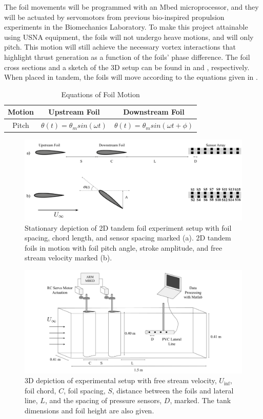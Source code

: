     The foil movements will be programmed with an Mbed microprocessor, and they will be actuated by servomotors from previous bio-inspired propulsion experiments in the Biomechanics Laboratory. To make this project attainable using USNA equipment, the foils will not undergo heave motions, and will only pitch. This motion will still achieve the necessary vortex interactions that highlight thrust generation as a function of the foils' phase difference. The foil cross sections and a sketch of the 3D setup can be found in  and , respectively. When placed in tandem, the foils will move according to the equations given in .
\begin{center}
\begin{table}
\caption{Equations of Foil Motion}
\label{tab:methods:EOM}
\begin{tabular}{ccc}
\toprule
Motion & Upstream Foil & Downstream Foil \\ 
\midrule
Pitch & \(\theta(t)=\theta _msin(\omega t)\) & \(\theta (t)=\theta _msin(\omega t+\phi)\) \\
\end{tabular}
\end{table}
\begin{figure}
\includegraphics[width=0.8\columnwidth]{figures/Experimental Setup.png}
\caption{Stationary depiction of 2D tandem foil experiment setup with foil spacing, chord length, and sensor spacing marked (a). 2D tandem foils in motion with foil pitch angle, stroke amplitude, and free stream velocity marked (b).}
\label{fig:methods:2D Setup}
\end{figure}
\begin{figure}
\includegraphics[width=0.95\columnwidth]{figures/3D Tank Setup.png}
\caption{3D depiction of experimental setup with free stream velocity, \(U_\inf\), foil chord, $C$, foil spacing, $S$, distance between the foils and lateral line, $L$, and the spacing of pressure sensors, $D$, marked. The tank dimensions and foil height are also given.}
\label{fig:methods:3D Setup}
\end{figure}
\end{center}

